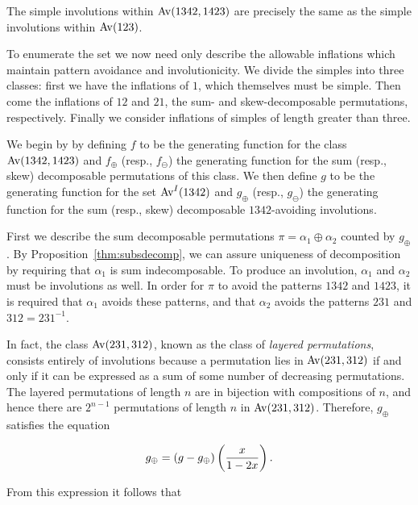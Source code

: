     \begin{corollary} \label{involutions:cor:1342simple}
      The simple involutions within $\operatorname{{Av}}(1342, 1423)$ are precisely the same
      as the simple involutions within $\operatorname{{Av}}(123)$. 
    \end{corollary}

    To enumerate the set we now need only describe the allowable inflations
    which maintain pattern avoidance and involutionicity. We divide the simples
    into three classes: first we have the inflations of $1$, which themselves
    must be simple. Then come the inflations of $12$ and $21$, the sum- and
    skew-decomposable permutations, respectively. Finally we consider
    inflations of simples of length greater than three. 



    We begin by by defining $f$ to be the generating function for the class
    $\operatorname{{Av}}(1342,1423)$ and $f_\oplus$ (resp., $f_\ominus$) the generating
    function for the sum (resp., skew) decomposable permutations of this class.
    We then define $g$ to be the generating function for the set $\operatorname{{Av}}^I(1342)$
    and $g_\oplus$ (resp., $g_\ominus$) the generating function for the sum
    (resp., skew) decomposable $1342$-avoiding involutions.

    
    First we describe the sum decomposable permutations
    $\pi=\alpha_1\oplus\alpha_2$ counted by $g_\oplus$. By
    Proposition~\ref{thm:subsdecomp}, we can assure uniqueness of
    decomposition by requiring that $\alpha_1$ is sum indecomposable. To produce
    an involution, $\alpha_1$ and $\alpha_2$ must be involutions as well. In
    order for $\pi$ to avoid the patterns $1342$ and $1423$, it is required that
    $\alpha_1$ avoids these patterns, and that $\alpha_2$ avoids the patterns
    $231$ and $312=231^{-1}$.

    In fact, the class $\operatorname{{Av}}(231,312)$, known as the class of \emph{layered
    permutations}, consists entirely of involutions because a permutation lies in
    $\operatorname{{Av}}(231,312)$ if and only if it can be expressed as a sum of some number of
    decreasing permutations. The layered permutations of length $n$ are in
    bijection with compositions of $n$, and hence there are $2^{n-1}$
    permutations of length $n$ in $\operatorname{{Av}}(231,312)$. Therefore, $g_\oplus$ satisfies
    the equation 
    
    $$ g_\oplus = \left({g - g_\oplus}\right)\left({\frac{x}{1-2x}}\right). $$

    From this expression it follows that

